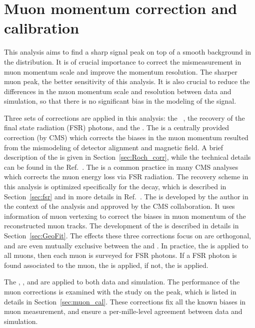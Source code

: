 \chapter{Muon momentum correction and calibration} \label{chp:muon_corr}

This analysis aims to find a sharp signal peak on top of a smooth background in the \mmm distribution.
It is of crucial importance to correct the mismeasurement in muon momentum scale and improve the momentum resolution.
The sharper muon peak, the better sensitivity of this analysis.
It is also crucial to reduce the differences in the muon momentum scale and resolution between data and simulation, 
so that there is no significant bias in the modeling of the signal.

Three sets of corrections are applied in this analysis: 
the \RochCorr~\cite{Bodek:2012id}, the recovery of the final state radiation (FSR) photons, and the \GeoFit.
The \RochCorr is a centrally provided correction (by CMS) which corrects 
the biases in the muon momentum resulted from the mismodeling of detector alignment and magnetic field. 
A brief description of the \RochCorr is given in Section~\ref{sec:Roch_corr}, 
while the technical details can be found in the Ref.~\cite{Bodek:2012id}.
The \FSR is a common practice in many CMS analyses which corrects the muon energy loss via FSR radiation.
The recovery scheme in this analysis is optimized specifically for the \hmm decay, which is described in Section~\ref{sec:fsr} and in more details in Ref.~\cite{oliverthesis}.
The \GeoFit is developed by the author in the context of the \hmm analysis and approved by the CMS collaboration.
It uses information of muon vertexing to correct the biases in muon momentum of the reconstructed muon tracks.
The development of the \GeoFit is described in details in Section~\ref{sec:GeoFit}.
The effects these three corrections focus on are orthogonal, and are even mutually exclusive between the \FSR and \GeoFit.
In practice, the \RochCorr is applied to all muons, then each muon is surveyed for FSR photons.
If a FSR photon is found associated to the muon, the \FSR is applied, 
if not, the \GeoFit is applied.

The \RochCorr, \FSR, and \GeoFit are applied to both data and simulation.
The performance of the muon corrections is examined with the study on the \zmm peak,
which is listed in details in Section~\ref{sec:muon_cal}.
These corrections fix all the known biases in muon measurement, 
and ensure a per-mille-level agreement between data and simulation. 

